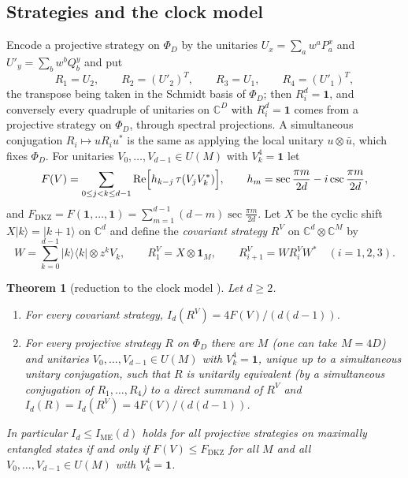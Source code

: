 \documentclass[11pt]{amsart}
\newtheorem{theorem}{Theorem}[section]
\theoremstyle{definition}
\theoremstyle{remark}
\numberwithin{equation}{section}
\newcommand{\C}{\mathbb{C}}
\renewcommand{\Re}{\operatorname{Re}}
\newcommand{\FD}{F_{\mathrm{DKZ}}}
\newcommand{\IME}{I_{\mathrm{ME}}}
\newcommand{\one}{\mathbf{1}}
\begin{document}
\subsection{Strategies and the clock model}
Encode a projective strategy on $\Phi_D$ by the unitaries $U_x=\sum_aw^aP^x_a$ and $U'_y=\sum_bw^bQ^y_b$ and put
\begin{equation}\label{eq:chainR}
R_1=U_2,\qquad R_2=(U'_2)^T,\qquad R_3=U_1,\qquad R_4=(U'_1)^T,
\end{equation}
the transpose being taken in the Schmidt basis of $\Phi_D$; then $R_i^d=\one$, and conversely every quadruple of
unitaries on $\C^D$ with $R_i^d=\one$ comes from a projective strategy on $\Phi_D$, through spectral projections.
A simultaneous conjugation $R_i\mapsto uR_iu^*$ is the same as applying the local unitary $u\otimes\bar u$, which fixes
$\Phi_D$. For unitaries $V_0,\dots,V_{d-1}\in U(M)$ with $V_k^4=\one$ let
\begin{equation}\label{eq:FV}
F(V)=\sum_{0\le j<k\le d-1}\Re\Bigl[h_{k-j}\,\tau(V_jV_k^*)\Bigr],\qquad h_m=\sec\frac{\pi m}{2d}-i\csc\frac{\pi m}{2d},
\end{equation}
and $\FD=F(\one,\dots,\one)=\sum_{m=1}^{d-1}(d-m)\sec\frac{\pi m}{2d}$. Let $X$ be the cyclic shift
$X|k\rangle=|k+1\rangle$ on $\C^d$ and define the \emph{covariant strategy} $R^V$ on $\C^d\otimes\C^M$ by
\begin{equation}\label{eq:covariant}
W=\sum_{k=0}^{d-1}|k\rangle\langle k|\otimes z^kV_k,\qquad R^V_1=X\otimes\one_M,\qquad R^V_{i+1}=WR^V_iW^*\quad(i=1,2,3).
\end{equation}

\begin{theorem}[reduction to the clock model {\cite[Theorem~2.3]{MS-classical}}]\label{thm:reduction}
Let $d\ge2$.
\begin{enumerate}
\item For every covariant strategy, $I_d(R^V)=4F(V)/(d(d-1))$.
\item For every projective strategy $R$ on $\Phi_D$ there are $M$ (one can take $M=4D$) and unitaries
$V_0,\dots,V_{d-1}\in U(M)$ with $V_k^4=\one$, unique up to a simultaneous unitary conjugation, such that $R$ is
unitarily equivalent (by a simultaneous conjugation of $R_1,\dots,R_4$) to a direct summand of $R^V$ and
$I_d(R)=I_d(R^V)=4F(V)/(d(d-1))$.
\end{enumerate}
In particular $I_d\le\IME(d)$ holds for all projective strategies on maximally entangled states if and only if
$F(V)\le\FD$ for all $M$ and all $V_0,\dots,V_{d-1}\in U(M)$ with $V_k^4=\one$.
\end{theorem}
\end{document}
